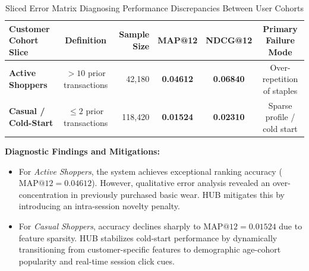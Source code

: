 \begin{table}[H]
\centering
{}
\begin{tabular}{|l|c|r|c|c|c|}
\hline
\rowcolor{gray!20} \textbf{Customer Cohort Slice} & \textbf{Definition} & \textbf{Sample Size} & \textbf{MAP@12} & \textbf{NDCG@12} & \textbf{Primary Failure Mode} \\ \hline
\textbf{Active Shoppers} & $> 10$ prior transactions & 42,180 & \textbf{0.04612} & \textbf{0.06840} & Over-repetition of staples \\ \hline
\textbf{Casual / Cold-Start} & $\le 2$ prior transactions & 118,420 & \textbf{0.01524} & \textbf{0.02310} & Sparse profile / cold start \\ \hline
\end{tabular}
\caption{Sliced Error Matrix Diagnosing Performance Discrepancies Between User Cohorts}
\label{tab:sliced_error_matrix}
\end{table}

\textbf{Diagnostic Findings and Mitigations:}
\begin{itemize}
    \item For \textit{Active Shoppers}, the system achieves exceptional ranking accuracy ($\text{MAP}@12 = 0.04612$). However, qualitative error analysis revealed an over-concentration in previously purchased basic wear. HUB mitigates this by introducing an intra-session novelty penalty.
    \item For \textit{Casual Shoppers}, accuracy declines sharply to $\text{MAP}@12 = 0.01524$ due to feature sparsity. HUB stabilizes cold-start performance by dynamically transitioning from customer-specific features to demographic age-cohort popularity and real-time session click cues.
\end{itemize}
